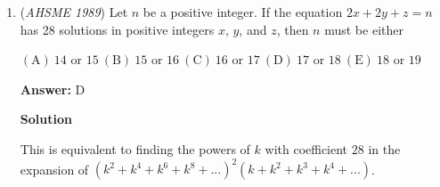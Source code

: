 \begin{enumerate}
 $\mathrm{(A) \frac{\sqrt{3}}{12} } \qquad \mathrm{(B) \frac{\sqrt{6}}{16} } \qquad \mathrm{(C) \frac{1}{6} } \qquad \mathrm{(D) \frac{\sqrt{2}}{8} } \qquad \mathrm{(E) \frac{1}{4} }$

 \textbf{Answer: }C



\textbf{Solution}

Call the length of a side of the cube x. Thus, the volume of the cube is $x^3$. We can then find that a side of this regular octahedron is the square root of $(\frac{x}{2})^2$+$(\frac{x}{2})^2$ which is equivalent to $\frac{x\sqrt{2}}{2}$. Using our general formula for the volume of a regular octahedron of side length a, which is $\frac{a^3\sqrt2}{3}$, we get that the volume of this octahedron is...

 $(\frac{x\sqrt{2}}{2})^3 \rightarrow \frac{x^3\sqrt{2}}{4} \rightarrow \frac{x^3\sqrt{2}}{4}*\frac{\sqrt{2}}{3} \rightarrow \frac{2x^3}{12}=\frac{x^3}{6}$

 Comparing the ratio of the volume of the octahedron to the cube is\ldots

 $\frac{\frac{x^3}{6}}{x^3} \rightarrow \frac{1}{6}$ or $\fbox{C}$




\textbf{Solution 2}

Split the cube in half along a cross-section parallel to two of the bases. Because of symmetry, we only need to compare the remaining square pyramid and the octahedron. Because the area of the base of the pyramid is half the area of the square base of the pyramid, and we divide by three for the pyramid's volume, our final answer is $\frac{1}{2} \cdot \frac{1}{3} = \frac{1}{6}$ or $\fbox{C}$.

 


	\item (\textit{AHSME 1989}) Let $n$ be a positive integer. If the equation $2x+2y+z=n$ has 28 solutions in positive integers $x$, $y$, and $z$, then $n$ must be either 


 $\mathrm{(A)}\ 14 \text{ or } 15\ \mathrm{(B)}\ 15 \text{ or } 16\ \mathrm{(C)}\ 16 \text{ or } 17\ \mathrm{(D)}\ 17 \text{ or } 18\ \mathrm{(E)}\ 18 \text{ or } 19$

 \textbf{Answer: }D



\textbf{Solution}

This is equivalent to finding the powers of $k$ with coefficient $28$ in the expansion of $(k^2+k^4+k^6+k^8+...)^2(k+k^2+k^3+k^4+...)$.


\end{enumerate}
